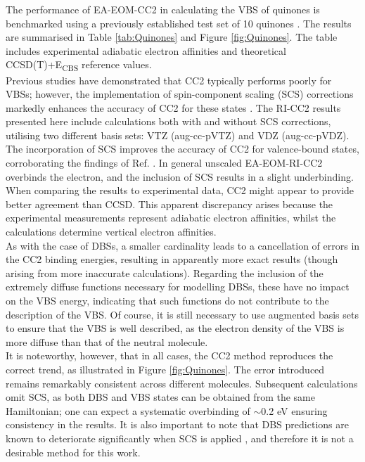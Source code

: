 The performance of EA-EOM-CC2 in calculating the VBS of quinones is benchmarked using a previously established test set of 10 quinones \cite{schulz2018systematic}. The results are summarised in Table \ref{tab:Quinones} and Figure \ref{fig:Quinones}. The table includes experimental adiabatic electron affinities and theoretical CCSD(T)+E\textsubscript{CBS} reference values.\\

Previous studies have demonstrated that CC2 typically performs poorly for VBSs; however, the implementation of spin-component scaling (SCS) corrections markedly enhances the accuracy of CC2 for these states \cite{paran2024performance}. The RI-CC2 results presented here include calculations both with and without SCS corrections, utilising two different basis sets: VTZ (aug-cc-pVTZ) and VDZ (aug-cc-pVDZ).\\

The incorporation of SCS improves the accuracy of CC2 for valence-bound states, corroborating the findings of Ref. . In general unscaled EA-EOM-RI-CC2 overbinds the electron, and the inclusion of SCS results in a slight underbinding. When comparing the results to experimental data, CC2 might appear to provide better agreement than CCSD. This apparent discrepancy arises because the experimental measurements represent adiabatic electron affinities, whilst the calculations determine vertical electron affinities.\\ 

 As with the case of DBSs, a smaller cardinality leads to a cancellation of errors in the CC2 binding energies, resulting in apparently more exact results (though arising from more inaccurate calculations). Regarding the inclusion of the extremely diffuse functions necessary for modelling DBSs, these have no impact on the VBS energy, indicating that such functions do not contribute to the description of the VBS. Of course, it is still necessary to use augmented basis sets to ensure that the VBS is well described, as the electron density of the VBS is more diffuse than that of the neutral molecule.\\

 It is noteworthy, however, that in all cases, the CC2 method reproduces the correct trend, as illustrated in Figure \ref{fig:Quinones}. The error introduced remains remarkably consistent across different molecules. Subsequent calculations omit SCS, as both DBS and VBS states can be obtained from the same Hamiltonian; one can expect a systematic overbinding of $\mathrm{\sim}$0.2 eV ensuring consistency in the results. It is also important to note that DBS predictions are known to deteriorate significantly when SCS is applied \cite{paran2024performance}, and therefore it is not a desirable method for this work. 

